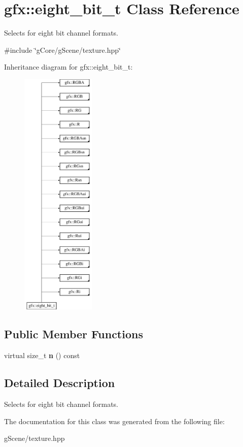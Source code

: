 \hypertarget{classgfx_1_1eight__bit__t}{\section{gfx\-:\-:eight\-\_\-bit\-\_\-t Class Reference}
\label{classgfx_1_1eight__bit__t}
}


Selects for eight bit channel formats.  




{\ttfamily \#include \char`\"{}g\-Core/g\-Scene/texture.\-hpp\char`\"{}}

Inheritance diagram for gfx\-:\-:eight\-\_\-bit\-\_\-t\-:\begin{figure}[H]
\begin{center}
\leavevmode
\includegraphics[height=12.000000cm]{classgfx_1_1eight__bit__t}
\end{center}
\end{figure}
\subsection*{Public Member Functions}
\begin{DoxyCompactItemize}
\item 
\hypertarget{classgfx_1_1eight__bit__t_a9ea91348fcffdae6153e2f5ab6953bdc}{virtual size\-\_\-t {\bfseries n} () const }\label{classgfx_1_1eight__bit__t_a9ea91348fcffdae6153e2f5ab6953bdc}

\end{DoxyCompactItemize}


\subsection{Detailed Description}
Selects for eight bit channel formats. 

The documentation for this class was generated from the following file\-:\begin{DoxyCompactItemize}
\item 
g\-Scene/texture.\-hpp\end{DoxyCompactItemize}
